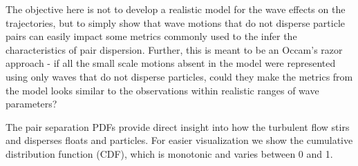 \documentclass[]{ametsoc}
\begin{document}
The objective here is not to develop a realistic model for the wave effects on the trajectories, but to simply show that wave motions that do not disperse particle pairs can easily impact some metrics commonly used to the infer the characteristics of pair dispersion. Further, this is meant to be an Occam's razor approach - if all the small scale motions absent in the model were represented using only waves that do not disperse particles, could they make the metrics from the model looks similar to the observations within realistic ranges of wave parameters?

\appendix[B]
The pair separation PDFs provide direct insight into how the turbulent flow stirs and disperses floats and particles. For easier visualization we show the cumulative distribution function (CDF), which is monotonic and varies between 0 and 1. 
\end{document}
